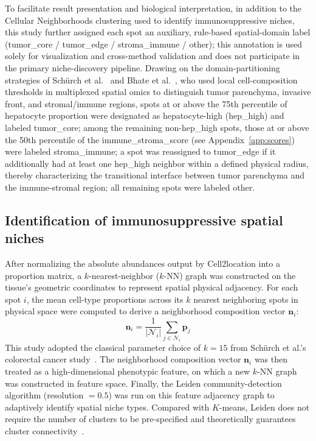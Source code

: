 \documentclass[12pt, a4paper]{article}
\begin{document}
To facilitate result presentation and biological interpretation, in addition to the Cellular Neighborhoods clustering used to identify immunosuppressive niches, this study further assigned each spot an auxiliary, rule-based spatial-domain label (tumor\_core / tumor\_edge / stroma\_immune / other); this annotation is used solely for visualization and cross-method validation and does not participate in the primary niche-discovery pipeline. Drawing on the domain-partitioning strategies of Schürch et al.~\citep{schurch2020coordinated} and Bhate et al.~\citep{bhate2022tissue}, who used local cell-composition thresholds in multiplexed spatial omics to distinguish tumor parenchyma, invasive front, and stromal/immune regions, spots at or above the 75th percentile of hepatocyte proportion were designated as hepatocyte-high (hep\_high) and labeled tumor\_core; among the remaining non-hep\_high spots, those at or above the 50th percentile of the immune\_stroma\_score (see Appendix~\ref{app:scores}) were labeled stroma\_immune; a spot was reassigned to tumor\_edge if it additionally had at least one hep\_high neighbor within a defined physical radius, thereby characterizing the transitional interface between tumor parenchyma and the immune-stromal region; all remaining spots were labeled other.

\subsection{Identification of immunosuppressive spatial niches}

After normalizing the absolute abundances output by Cell2location into a proportion matrix, a $k$-nearest-neighbor ($k$-NN) graph was constructed on the tissue's geometric coordinates to represent spatial physical adjacency. For each spot $i$, the mean cell-type proportions across its $k$ nearest neighboring spots in physical space were computed to derive a neighborhood composition vector $\mathbf{n}_i$:
\begin{equation}
\mathbf{n}_i = \frac{1}{|\mathcal{N}_i|} \sum_{j \in \mathcal{N}_i} \mathbf{p}_j
\label{eq:neighborhood_vector}
\end{equation}
This study adopted the classical parameter choice of $k=15$ from Schürch et al.'s colorectal cancer study~\citep{schurch2020coordinated}. The neighborhood composition vector $\mathbf{n}_i$ was then treated as a high-dimensional phenotypic feature, on which a new $k$-NN graph was constructed in feature space. Finally, the Leiden community-detection algorithm (resolution $=0.5$) was run on this feature adjacency graph to adaptively identify spatial niche types. Compared with $K$-means, Leiden does not require the number of clusters to be pre-specified and theoretically guarantees cluster connectivity~\citep{traag2019leiden}.
\end{document}
